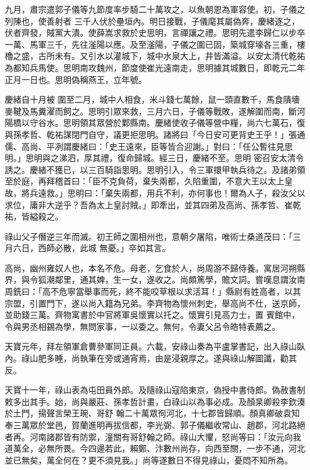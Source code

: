 \begin{pinyinscope}
 九月，肅宗遣郭子儀等九節度率步騎二十萬攻之，以魚朝恩為軍容使。初，子儀之列陳也，使善射者
 三千人伏於壘垣內。明日接戰，子儀麾其屬偽奔，慶緒逐之，伏者齊發，賊黨大潰。使薛嵩求救於史思明，言禪讓之禮。思明先遣李歸仁以步卒一萬、馬軍三千，先往滏陽以應。及至滏陽，子儀之圍已固，築城穿壕各三重，樓櫓之盛，古所未有。又引水以灌城下，城中水泉大上，井皆滿溢。以安太清代乾祐為都知兵馬使。思明南攻魏州，節度使崔光遠南走，思明據其城數日，即乾元二年正月一日也。思明偽稱燕王，立年號。



 慶緒自十月被
 圍至二月，城中人相食，米斗錢七萬餘，鼠一頭直數千，馬食隤墻麥鞬及馬糞濯而飼之。思明引眾來救，三月六日，子儀等戰敗，遂解圍而南，斷河陽橋以守谷水。思明領其眾營於鄴縣南。慶緒使收子儀等營中糧，尚六七萬石，復與孫孝哲、乾祐謀閉門自守，議更拒思明。諸將曰「今日安可更背史王乎！」張通儒、高尚、平冽謂慶緒曰：「史王遠來，臣等皆合迎謝。」對曰：「任公暫往見思明。」思明與之涕泗，厚其禮，復命歸城。經三日，慶緒不至。思明
 密召安太清令誘之。慶緒不獲已，以三百騎詣思明。思明引入，令三軍擐甲執兵待之。及諸弟領至於庭，再拜稽首曰：「臣不克負荷，棄失兩都，久陷重圍，不意大王以太上皇故，將兵遠救。」思明曰：「棄失兩都，用兵不利，亦何事也！爾為人子，殺汝父以求位，庸非大逆乎？吾為太上皇討賊。」即牽出，並其四弟及高尚、孫孝哲、崔乾祐，皆縊殺之。



 祿山父子僭逆三年而滅。初王師之圍相州也，意朝夕屠陷，唯術士桑道茂曰：「三月六日，西師必散，此城
 無憂。」卒如其言。



 高尚，幽州雍奴人也，本名不危。母老，乞食於人，尚周游不歸侍養。寓居河朔縣界，與令狐潮鄰里，通其婢，生一女，遂收之。尚頗篤學，贍文詞。嘗嘆息謂汝南周銑曰：「高不危寧當舉事而死，終不能咬草根以求活耳！」縣尉有姓高者，以其宗盟，引置門下，遂以尚入籍為兄弟。李齊物為懷州刺史，舉高尚不仕，送京師，並助錢三萬。齊物寓書於中官將軍吳懷實以托之。懷實引見高力士，置
 賓館中，令與男丞相錫為學，無問家事，一以委之。無何，令妻父呂令皓特表薦之。



 天寶元年，拜左領軍倉曹參軍同正員。六載，安祿山奏為平盧掌書記，出入祿山臥內。祿山肥多睡，尚執筆在旁或通宵焉，由是浸親厚之。遂與祿山解圖讖，勸其反。



 天寶十一年，祿山表為屯田員外郎。及隨祿山寇陷東京，偽授中書侍郎。偽赦書制敕多出其手。始，尚與嚴莊、孫孝哲計畫，白祿山以為事必成。及顏杲卿殺李欽湊於土門，揚聲言榮王琬、哥舒
 翰二十萬眾徇河北，十七郡皆歸順。顏真卿破袁知奉三萬眾於堂邑，賀蘭進明再拔信都，李光弼、郭子儀繼收常山、趙郡，河北路絕者再。河南諸郡皆有防禦，潼關有哥舒翰之師。祿山大懼，怒尚等曰：「汝元向我道萬全，必無所畏。今四邊若此，賴鄭、汴數州尚存，向西至關，一步不通，河北並已無矣，萬全何在？更不須見我。」尚等遂數日不得見祿山，憂悶不知所為。




\end{pinyinscope}
